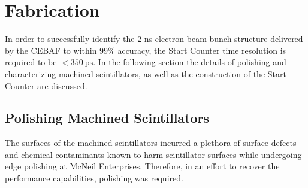 \section{Fabrication} \label{sec:fab}

In order to successfully identify the 2 ns electron beam bunch structure delivered by the CEBAF to within 99\% accuracy, the \gx{} Start Counter time resolution is required to be $<350\ \mathrm{ps}$.  In the following section the details of polishing and characterizing machined scintillators, as well as the construction of the Start Counter are discussed.

\subsection{Polishing Machined Scintillators} \label{sec:fab_polish}

The surfaces of the machined scintillators incurred a plethora of surface defects and chemical contaminants known to harm scintillator surfaces while undergoing edge polishing at McNeil Enterprises.  Therefore, in an effort to recover the performance capabilities, polishing was required.



